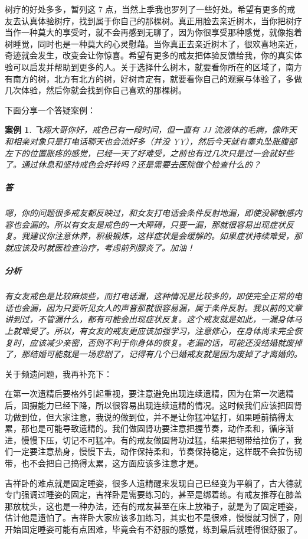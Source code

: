 \documentclass{ctexart}
\newtheorem{case}{案例}
\begin{document}
树疗的好处多多，暂列这 7 点，当然上季我也罗列了一些好处。希望有更多的戒友去认真体验树疗，找到属于你自己的那棵树。真正用脸去亲近树木，当你把树疗当作一种莫大的享受时，就不会再感到无聊了，因为你很享受那种感觉，就像抱着树睡觉，同时也是一种莫大的心灵慰藉。当你真正去亲近树木了，很欢喜地亲近，奇迹就会发生，改变会让你惊喜。希望有更多的戒友把体验反馈给我，你的真实体验可以启发并帮助到更多的人。关于选择什么树木，就要看你所在的区域了，南方有南方的树，北方有北方的树，好树肯定有，就要看你自己的观察与体验了，多做几次体验，然后你就会找到你自己喜欢的那棵树。

下面分享一个答疑案例：

\begin{case}
    飞翔大哥你好，戒色已有一段时间，但一直有 JJ 流液体的毛病，像昨天和相亲对象只是打电话聊天也会流好多（并没 YY），然后今天就有睾丸坠胀腹部左下的位置胀疼的感觉，已经一天了好难受，之前也有过几次只是过一会就好些了。通过休息和坚持戒色会好转吗？还是需要去医院做个检查什么的？

    \subparagraph{答} 嗯，你的问题很多戒友都反映过，和女友打电话会条件反射地漏，即使没聊敏感内容也会漏的。所以有女友是戒色的一大障碍，只要一漏，那就很容易出现症状反复。我建议你注意休养，积极锻炼，这样症状是会缓解的。如果症状持续难受，那就应该及时就医检查治疗，考虑前列腺炎了。加油！

    \subparagraph{分析} 有女友戒色是比较麻烦些，而打电话漏，这种情况是比较多的，即使完全正常的电话也会漏，因为只要听见女人的声音那就很容易漏，属于条件反射。我以前的文章讲到过，不管漏什么，都有可能会出现症状反复。这个戒友就是如此，一漏身体马上就难受了。所以，有女友的戒友更应该加强学习，注意修心，在身体尚未完全恢复时，应该减少亲密，否则不利于你身体的恢复。老漏的话，可能还没结婚就废掉了，那结婚可能就是一场悲剧了，记得有几个已婚戒友就是因为废掉了才离婚的。
\end{case}

关于频遗问题，我再补充下：

在第一次遗精后要格外引起重视，要注意避免出现连续遗精，因为在第一次遗精后，固摄能力已经下降，所以很容易出现连续遗精的情况。这时候我们应该把固肾功做到位，但大家注意，我说的做到位，并不是让你猛冲猛打，如果睡前搞得太累，那也是可能导致遗精的。我们做固肾功要注意把握节奏，动作柔和，循序渐进，慢慢下压，切记不可猛冲。有的戒友做固肾功过猛，结果把韧带给拉伤了，我们一定要注意热身，慢慢下去，动作保持柔和，节奏保持稳定，这样既不会拉伤韧带，也不会把自己搞得太累，这方面应该多注意才是。

吉祥卧的难点就是固定睡姿，很多人遗精醒来发现自己已经变为平躺了，古大德就专门强调过睡姿的固定，吉祥卧是需要练习的，甚至是绑着练。有戒友推荐在膝盖那放枕头，这也是一种办法，还有的戒友甚至在床上放箱子，就是为了固定睡姿，估计他是遗怕了。吉祥卧大家应该多加练习，其实也不是很难，慢慢就习惯了，刚开始固定睡姿可能有点困难，毕竟会有不舒服的感觉，练到最后就睡得很舒服了。
\end{document}
